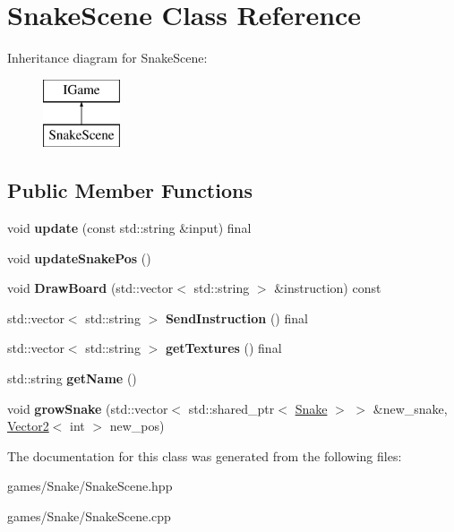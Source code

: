 \hypertarget{class_snake_scene}{}\section{Snake\+Scene Class Reference}
\label{class_snake_scene}
Inheritance diagram for Snake\+Scene\+:\begin{figure}[H]
\begin{center}
\leavevmode
\includegraphics[height=2.000000cm]{class_snake_scene}
\end{center}
\end{figure}
\subsection*{Public Member Functions}
\begin{DoxyCompactItemize}
\item 
\mbox{\label{class_snake_scene_af43a25f1cde6abc3afed8c54ac22d235}} 
void {\bfseries update} (const std\+::string \&input) final
\item 
\mbox{\label{class_snake_scene_a84d8f1a9181ab8332469ae564c2145e8}} 
void {\bfseries update\+Snake\+Pos} ()
\item 
\mbox{\label{class_snake_scene_a41b14152eb3e5df7672fe1bb4ad36c38}} 
void {\bfseries Draw\+Board} (std\+::vector$<$ std\+::string $>$ \&instruction) const
\item 
\mbox{\label{class_snake_scene_ab88cd1b9a95407dc0e41f23ebc937e89}} 
std\+::vector$<$ std\+::string $>$ {\bfseries Send\+Instruction} () final
\item 
\mbox{\label{class_snake_scene_a5847a39fe44c47250e6a8f0be0641d8c}} 
std\+::vector$<$ std\+::string $>$ {\bfseries get\+Textures} () final
\item 
\mbox{\label{class_snake_scene_a06bd9d46a276bd6f2f92f67ede48152c}} 
std\+::string {\bfseries get\+Name} ()
\item 
\mbox{\label{class_snake_scene_ac92bd4ff297c2909718cdc229e7b49f3}} 
void {\bfseries grow\+Snake} (std\+::vector$<$ std\+::shared\+\_\+ptr$<$ \hyperlink{class_snake}{Snake} $>$ $>$ \&new\+\_\+snake, \hyperlink{struct_vector2}{Vector2}$<$ int $>$ new\+\_\+pos)
\end{DoxyCompactItemize}


The documentation for this class was generated from the following files\+:\begin{DoxyCompactItemize}
\item 
games/\+Snake/Snake\+Scene.\+hpp\item 
games/\+Snake/Snake\+Scene.\+cpp\end{DoxyCompactItemize}
